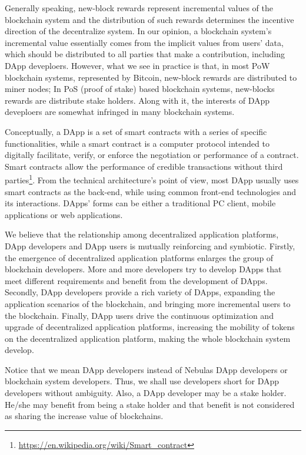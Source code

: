 Generally speaking,  new-block rewards represent incremental values of the blockchain system and the distribution of such rewards determines the incentive direction of the decentralize system. In our opinion, a blockchain system's incremental value essentially comes from the implicit values from users' data, which should be distributed to all parties that make a contribution, including DApp deveploers. However, what we see in practice is that, in most PoW blockchain systems, represented by Bitcoin, new-block rewards are distributed to miner nodes; In PoS (proof of stake) based blockchain systems, new-blocks rewards are distribute stake holders. Along with it, the interests of DApp deveploers are somewhat infringed in many blockchain systems.

Conceptually, a DApp is a set of smart contracts with a series of specific
functionalities, while a smart contract is a computer protocol intended to
digitally facilitate, verify, or enforce the negotiation or performance of a
contract. Smart contracts allow the performance of credible transactions
without third
parties\footnote{\url{https://en.wikipedia.org/wiki/Smart\_contract}}.
From the technical architecture's point of view, most DApp usually uses smart contracts as the back-end, while using common front-end technologies and its interactions. DApps' forms can be either a traditional PC client, mobile applications or web applications.

We believe that the relationship among decentralized application platforms, DApp developers and DApp users is mutually reinforcing and symbiotic. Firstly, the emergence of decentralized application platforms enlarges the group of blockchain developers. More and more developers try to develop DApps that meet different requirements and benefit from the development of DApps. Secondly, DApp developers provide a rich variety of DApps, expanding the application scenarios of the blockchain, and bringing more incremental users to the blockchain. Finally, DApp users drive the continuous optimization and upgrade of decentralized application platforms, increasing the mobility of tokens on the decentralized application platform, making the whole blockchain system develop.

Notice that we mean DApp developers instead of Nebulas DApp developers or
blockchain system developers. Thus, we shall use developers short for DApp
developers without ambiguity. Also, a DApp developer may be a stake holder.
He/she may benefit from being a stake holder and that benefit is not considered
as sharing the increase value of blockchains.


